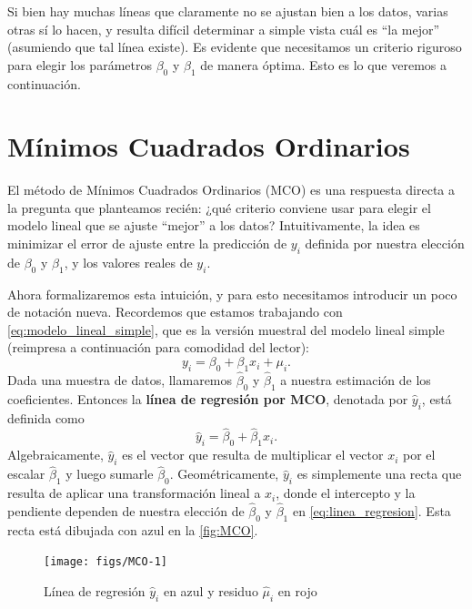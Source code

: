 \documentclass{report}\usepackage[]{graphicx}\usepackage[]{color}
\newenvironment{knitrout}{}{} %
\newcommand*{\kw}[1]{\textbf{#1}\index{#1}}
\begin{document}
Si bien hay muchas líneas que claramente no se ajustan bien a los datos, varias otras sí lo hacen, y resulta difícil determinar a simple vista cuál es ``la mejor'' (asumiendo que tal línea existe).
Es evidente que necesitamos un criterio riguroso para elegir los parámetros $\beta_0$ y $\beta_1$ de manera óptima.
Esto es lo que veremos a continuación.


\section{Mínimos Cuadrados Ordinarios}
\label{sec:MCO}

El método de Mínimos Cuadrados Ordinarios (MCO) es una respuesta directa a la pregunta que planteamos recién: ¿qué criterio conviene usar para elegir el modelo lineal que se ajuste ``mejor'' a los datos?
Intuitivamente, la idea es minimizar el error de ajuste entre la predicción de $y_i$ definida por nuestra elección de $\beta_0$ y $\beta_1$, y los valores reales de $y_i$.




Ahora formalizaremos esta intuición, y para esto necesitamos introducir un poco de notación nueva.
Recordemos que estamos trabajando con \eqref{eq:modelo_lineal_simple}, que es la versión muestral del modelo lineal simple (reimpresa a continuación para comodidad del lector):
\begin{equation*}
y_i = \beta_0 + \beta_1 x_i + \mu_i.
\end{equation*}
Dada una muestra de datos, llamaremos $\hat\beta_0$ y $\hat\beta_1$ a nuestra estimación de los coeficientes.
Entonces la \kw{línea de regresión por MCO}, denotada por $\hat y_i$, está definida como
\begin{equation}
\hat y_i = \hat\beta_0 + \hat\beta_1 x_i.
\label{eq:linea_regresion}
\end{equation}
Algebraicamente, $\hat y_i$ es el vector que resulta de multiplicar el vector $x_i$ por el escalar $\hat\beta_1$ y luego sumarle $\hat\beta_0$.
Geométricamente, $\hat y_i$ es simplemente una recta que resulta de aplicar una transformación lineal a $x_i$, donde el intercepto y la pendiente dependen de nuestra elección de $\hat\beta_0$ y $\hat\beta_1$ en \eqref{eq:linea_regresion}.
Esta recta está dibujada con azul en la \autoref{fig:MCO}.

\begin{knitrout}
\color{fgcolor}\begin{figure}[htb]

{\centering \texttt{[image: figs/MCO-1]} 

}

\caption[Línea de regresión $\hat y_i$ en azul y residuo $\hat \mu_i$ en rojo]{Línea de regresión $\hat y_i$ en azul y residuo $\hat \mu_i$ en rojo}\label{fig:MCO}
\end{figure}


\end{knitrout}
\end{document}

